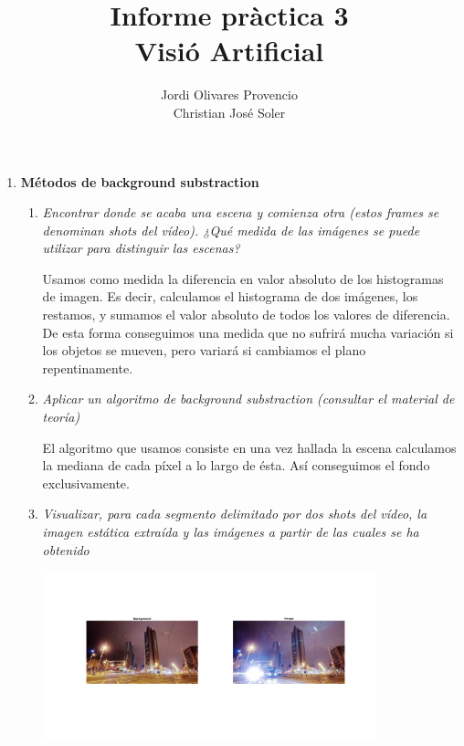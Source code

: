 \documentclass{article}
\title{Informe pràctica 3\\Visió Artificial}
\author{Jordi Olivares Provencio\\Christian José Soler}
\begin{document}
\maketitle

\begin{enumerate}

 \item \textbf{Métodos de background substraction}

 \begin{enumerate}

 \item \textit{Encontrar  donde  se  acaba  una  escena  y  comienza  otra  (estos  frames  se denominan  shots del  vídeo).  ¿Qué  medida  de  las  imágenes  se  puede utilizar para distinguir las escenas?}
 
 Usamos como medida la diferencia en valor absoluto de los histogramas de imagen. Es decir, calculamos el histograma de dos imágenes, los restamos, y sumamos el valor absoluto de todos los valores de diferencia. De esta forma conseguimos una medida que no sufrirá mucha variación si los objetos se mueven, pero variará si cambiamos el plano repentinamente.

 \item \textit{Aplicar  un  algoritmo  de  background  substraction  (consultar  el  material 
de teoría)}

El algoritmo que usamos consiste en una vez hallada la escena calculamos la mediana de cada píxel a lo largo de ésta. Así conseguimos el fondo exclusivamente.

 \item \textit{Visualizar, para  cada  segmento  delimitado  por  dos  shots  del  vídeo,  la  imagen 
estática extraída y las imágenes a partir de las cuales se ha obtenido}

\begin{center}
	\includegraphics[width=0.8\textwidth]{ej31a.png}
\end{center}


\end{enumerate}
\end{enumerate}
\end{document}
